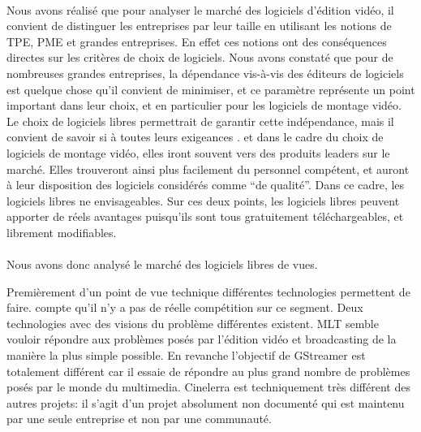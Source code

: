 \paragraph{}

Nous avons réalisé que pour analyser le marché des logiciels
d'édition vidéo, il convient de distinguer les entreprises par leur
taille en utilisant les notions de TPE, PME et grandes entreprises. En
effet ces notions ont des conséquences directes sur les critères
de choix de logiciels.  Nous avons constaté que pour de
nombreuses  grandes entreprises, la dépendance vis-à-vis des éditeurs
de logiciels est quelque chose qu'il convient de minimiser, et ce
paramètre représente un point important dans leur choix,
et en particulier pour les logiciels de montage vidéo. 
Le choix de logiciels libres permettrait de garantir cette indépendance, mais il
convient de savoir si à toutes leurs exigeances . 
%
%
et dans le cadre du choix de logiciels de montage vidéo, elles iront
souvent vers des produits leaders sur le marché. Elles trouveront ainsi
plus facilement du personnel compétent, et auront à leur disposition
des logiciels considérés comme ``de qualité''. Dans ce cadre, les
logiciels libres ne %
envisageables. 
%
%
Sur ces deux points, les logiciels libres peuvent apporter de
réels avantages puisqu'ils sont tous gratuitement téléchargeables,
et librement modifiables.


\paragraph{}

Nous avons donc analysé le marché des logiciels libres %
de vues.

Premièrement d'un point de vue technique %
différentes technologies permettent de faire.%
compte qu'il n'y a pas de réelle compétition sur ce segment. Deux
technologies avec des visions du problème différentes existent. MLT
semble vouloir répondre aux problèmes posés par l'édition vidéo
et broadcasting de la manière la plus simple possible. En revanche
l'objectif de GStreamer est totalement différent car il essaie de
répondre au plus grand nombre de problèmes posés par le monde
du multimedia.
Cinelerra est techniquement très différent des autres projets: il
s'agit d'un projet %
absolument non documenté qui est maintenu par une seule entreprise et
non par une communauté.

